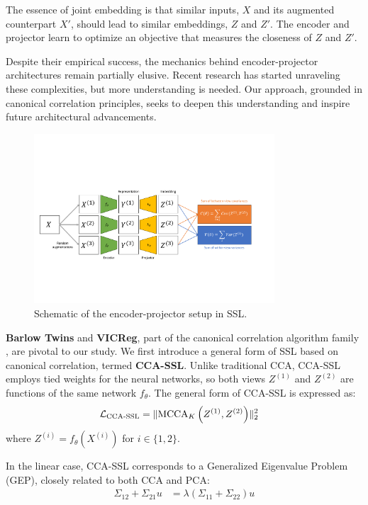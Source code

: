 The essence of joint embedding is that similar inputs, \( X \) and its augmented counterpart \( X' \), should lead to similar embeddings, \( Z \) and \( Z' \). The encoder and projector learn to optimize an objective that measures the closeness of \( Z \) and \( Z' \).

Despite their empirical success, the mechanics behind encoder-projector architectures remain partially elusive. Recent research \cite{ma2023deciphering, jing2021understanding} has started unraveling these complexities, but more understanding is needed. Our approach, grounded in canonical correlation principles, seeks to deepen this understanding and inspire future architectural advancements.

\begin{figure}
    \centering
    \includegraphics[width=0.8\textwidth]{figures/ssl_schematic}
    \caption{Schematic of the encoder-projector setup in SSL.}
    \label{fig:sslschematic}
\end{figure}

\textbf{Barlow Twins} and \textbf{VICReg}, part of the canonical correlation algorithm family \citep{balestriero2023cookbook}, are pivotal to our study. We first introduce a general form of SSL based on canonical correlation, termed \textbf{CCA-SSL}. Unlike traditional CCA, CCA-SSL employs tied weights for the neural networks, so both views \( Z^{(1)} \) and \( Z^{(2)} \) are functions of the same network \( f_{\theta} \). The general form of CCA-SSL is expressed as:
\begin{align}
    \mathcal{L}_\text{CCA-SSL} &= \lVert\operatorname{MCCA}_K\left(Z^{(1)}, Z^{(2)}\right)\rVert_2^2 \label{eq:cca-ssl}
\end{align}
where \( Z^{(i)} = f_{\theta}(X^{(i)}) \) for \( i \in \{1, 2\} \).

In the linear case, CCA-SSL corresponds to a Generalized Eigenvalue Problem (GEP), closely related to both CCA and PCA:
\begin{align}
    \Sigma_{12} + \Sigma_{21} u &= \lambda (\Sigma_{11} + \Sigma_{22}) u \label{eq:gep}
\end{align}

